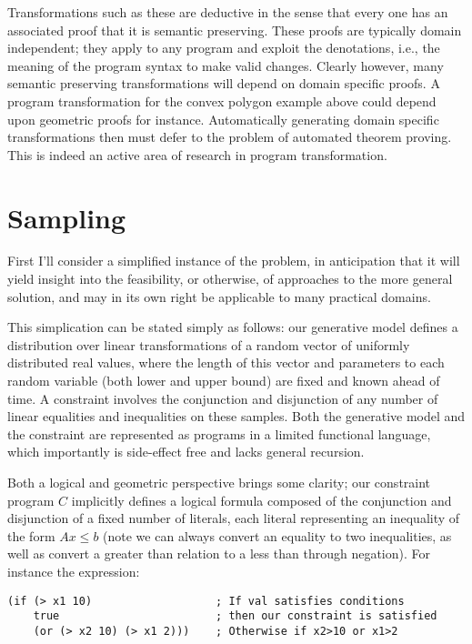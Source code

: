 Transformations such as these are deductive in the sense that every one has an associated proof that it is semantic preserving.
These proofs are typically domain independent; they apply to any program and exploit the denotations, i.e., the meaning of the program syntax to make valid changes.
Clearly however, many semantic preserving transformations will depend on domain specific proofs.
A program transformation for the convex polygon example above could depend upon geometric proofs for instance.
Automatically generating domain specific transformations then must defer to the problem of automated theorem proving.
This is indeed an active area of research in program transformation.

\section{Sampling}

First I'll consider a simplified instance of the problem, in anticipation that it will yield insight into the feasibility, or otherwise, of approaches to the more general solution, and may in its own right be applicable to many practical domains.

This simplication can be stated simply as follows: our generative model defines a distribution over linear transformations of a random vector of uniformly distributed real values, where the length of this vector and parameters to each random variable (both lower and upper bound) are fixed and known ahead of time.
A constraint involves the conjunction and disjunction of any number of linear equalities and inequalities on these samples.
Both the generative model and the constraint are represented as programs in a limited functional language, which importantly is side-effect free and lacks general recursion.

Both a logical and geometric perspective brings some clarity; our constraint program $C$ implicitly defines a logical formula composed of the conjunction and disjunction of a fixed number of literals, each literal representing an inequality of the form $Ax \le b$ (note we can always convert an equality to two inequalities, as well as convert a greater than relation to a less than through negation).
For instance the expression:

\begin{verbatim}
(if (> x1 10)                   ; If val satisfies conditions
    true                        ; then our constraint is satisfied
    (or (> x2 10) (> x1 2)))    ; Otherwise if x2>10 or x1>2
\end{verbatim}

